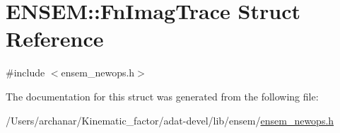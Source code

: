 \hypertarget{structENSEM_1_1FnImagTrace}{}\section{E\+N\+S\+EM\+:\+:Fn\+Imag\+Trace Struct Reference}
\label{structENSEM_1_1FnImagTrace}


{\ttfamily \#include $<$ensem\+\_\+newops.\+h$>$}



The documentation for this struct was generated from the following file\+:\begin{DoxyCompactItemize}
\item 
/\+Users/archanar/\+Kinematic\+\_\+factor/adat-\/devel/lib/ensem/\mbox{\hyperlink{adat-devel_2lib_2ensem_2ensem__newops_8h}{ensem\+\_\+newops.\+h}}\end{DoxyCompactItemize}
